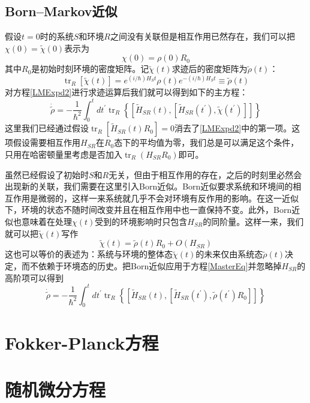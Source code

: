 \subsection{Born--Markov近似}
假设$t=0$时的系统$S$和环境$R$之间没有关联但是相互作用已然存在，我们可以把$\chi(0)=\tilde{\chi}(0)$表示为
\begin{equation}
\chi(0)=\rho(0) R_{0}
\end{equation}
其中$R_{0}$是初始时刻环境的密度矩阵。记$\tilde{\chi}(t)$求迹后的密度矩阵为$\tilde{\rho}(t)$：
\begin{equation}
\operatorname{tr}_{R}[\tilde{\chi}(t)]=e^{(i / \hbar) H_{S} t} \rho(t) e^{-(i / \hbar) H_{S} t} \equiv \tilde{\rho}(t)
\end{equation}
对方程\eqref{LMExpd2}进行求迹运算后我们就可以得到如下的主方程：
\begin{equation}
\dot{\tilde{\rho}}=-\frac{1}{\hbar^{2}} \int_{0}^{t} d t^{\prime} \operatorname{tr}_{R}\left\{\left[\tilde{H}_{S R}(t),\left[\tilde{H}_{S R}\left(t^{\prime}\right), \tilde{\chi}\left(t^{\prime}\right)\right]\right]\right\}
\label{MasterEq}
\end{equation}
这里我们已经通过假设$\operatorname{tr}_{R}\left[\tilde{H}_{S R}(t) R_{0}\right]=0$消去了\eqref{LMExpd2}中的第一项。这项假设需要相互作用$H_{S R}$在$R_{0}$态下的平均值为零，我们总是可以满足这个条件，只用在哈密顿量里考虑是否加入$\operatorname{tr}_{R}\left(H_{S R} R_{0}\right)$即可。

虽然已经假设了初始时$S$和$R$无关，但由于相互作用的存在，之后的时刻里必然会出现新的关联，我们需要在这里引入Born近似。Born近似要求系统和环境间的相互作用是微弱的，这样一来系统就几乎不会对环境有反作用的影响。在这一近似下，环境的状态不随时间改变并且在相互作用中也一直保持不变。此外，Born近似也意味着在处理$\chi(t)$受到的环境影响时只包含$H_{SR}$的同阶量。这样一来，我们就可以把$\tilde{\chi}(t)$写作
\begin{equation}
\tilde{\chi}(t)=\tilde{\rho}(t) R_{0}+O\left(H_{S R}\right)
\end{equation}
这也可以等价的表述为：系统与环境的整体态$\tilde{\chi}(t)$的未来仅由系统态$\tilde{\rho}(t)$决定，而不依赖于环境态的历史。把Born近似应用于方程\eqref{MasterEq}并忽略掉$H_{S R}$的高阶项可以得到
\begin{equation}
\dot{\tilde{\rho}}=-\frac{1}{\hbar^{2}} \int_{0}^{t} d t^{\prime} \operatorname{tr}_{R}\left\{\left[\tilde{H}_{S R}(t),\left[\tilde{H}_{S R}\left(t^{\prime}\right), \tilde{\rho}\left(t^{\prime}\right) R_{0}\right]\right]\right\}
\end{equation}


\section{Fokker-Planck方程}


\section{随机微分方程}